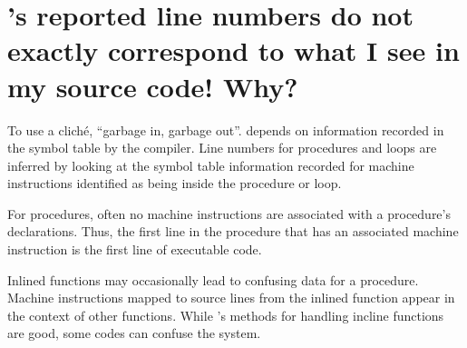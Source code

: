 \documentclass[11pt,letterpaper]{report}
\begin{document}




\section{\hpcviewer{}'s reported line numbers do not exactly correspond to what I see in my source code!  Why?}

To use a clich\'{e}, ``garbage in, garbage out''.
\HPCToolkit{} depends on information recorded in the symbol table by the compiler.
Line numbers for procedures and loops are inferred by looking at the symbol table information recorded for machine instructions identified as being inside the procedure or loop.

For procedures, often no machine instructions are associated with a procedure's declarations.
Thus, the first line in the procedure that has an associated machine instruction is the first line of executable code.

Inlined functions may occasionally lead to confusing data for a procedure.
Machine instructions mapped to source lines from the inlined function appear in the context of other functions.
While \hpcprof{}'s methods for handling incline functions are good, some codes can confuse the system.
\end{document}
